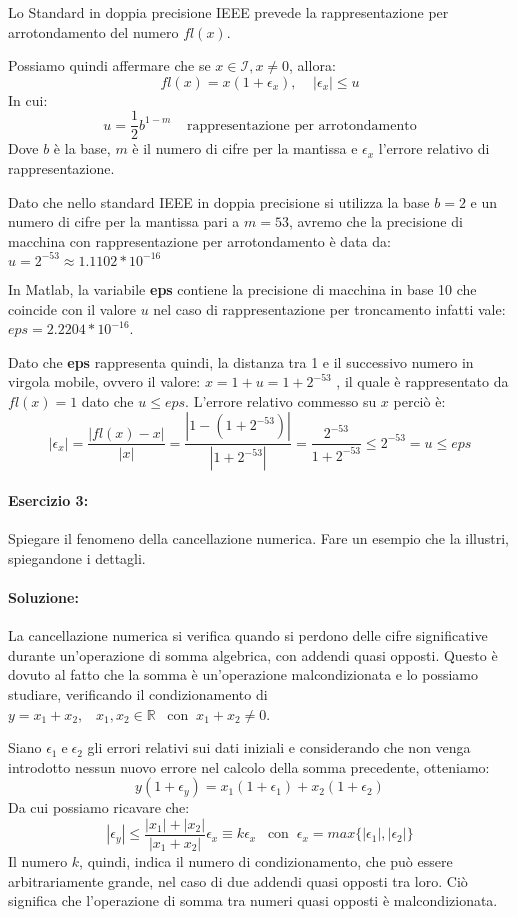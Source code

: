 \documentclass[12pt]{article}
\begin{document}
Lo Standard in doppia precisione IEEE prevede la rappresentazione per arrotondamento del numero \(fl(x)\).

Possiamo quindi affermare che se \(x \in \mathcal{I}, x\neq 0\), allora:
$$ fl(x)=x(1+\epsilon_x), \;\;\;\; |\epsilon_x|\leq u$$
In cui:
$$ u = \frac{1}{2}b^{1-m}\;\;\;\; \text{rappresentazione per arrotondamento}$$   
Dove \(b\) è la base, \(m\) è il numero di cifre per la mantissa e \(\epsilon_x\) l'errore relativo di rappresentazione.

Dato che nello standard IEEE in doppia precisione si utilizza la base \(b=2\) e un numero di cifre per la mantissa pari a \(m=53\), avremo che la 
precisione di macchina con rappresentazione per arrotondamento è data da: \(u=2^{-53}\approx 1.1102* 10^{-16}\)

In Matlab, la variabile \textbf{eps} contiene la precisione di macchina in base 10 che coincide con il valore \(u\) nel caso di rappresentazione per troncamento
infatti vale: \(eps=2.2204*10^{-16}\). 

Dato che \textbf{eps} rappresenta quindi, la distanza tra 1 e il successivo numero in virgola mobile, ovvero il valore: \(x=1+u=1+2^{-53}\)
, il quale è rappresentato da \(fl(x)=1\) dato che \(u\leq eps\). 
L'errore relativo commesso su \(x\) perciò è:
$$ |\epsilon_x| =\frac{|fl(x)-x|}{|x|}=\frac{|1-(1+2^{-53})|}{|1+2^{-53}|}=\frac{2^{-53}}{1+2^{-53}} \le 2^{-53}=u \le eps$$

\paragraph{Esercizio 3:} Spiegare il fenomeno della cancellazione numerica. Fare un esempio che la illustri, spiegandone i dettagli.

\paragraph{Soluzione:}
La cancellazione numerica si verifica quando si perdono delle cifre significative durante un'operazione di somma algebrica, con addendi quasi opposti.
Questo è dovuto al fatto che la somma è un'operazione malcondizionata e lo possiamo studiare, verificando il condizionamento di \(y=x_1+x_2,\;\;\; x_1,x_2 \in \mathbb{R} \;\;\;\text{con}\;\; x_1+x_2\neq 0\).

Siano \(\epsilon_1 \;\text{e}\; \epsilon_2\) gli errori relativi sui dati iniziali e considerando che non venga introdotto nessun nuovo errore nel calcolo della somma precedente, otteniamo:
$$ y(1+\epsilon_y)=x_1(1+\epsilon_1)+x_2(1+\epsilon_2)$$
Da cui possiamo ricavare che:
$$ |\epsilon_y|\leq \frac{|x_1|+|x_2|}{|x_1+x_2|}\epsilon_x\equiv k\epsilon_x \;\;\;\text{con}\;\; \epsilon_x = max\{|\epsilon_1|,|\epsilon_2|\} $$
Il numero \(k\), quindi, indica il numero di condizionamento, che può essere arbitrariamente grande, nel caso di due addendi quasi opposti tra loro. 
Ciò significa che l'operazione di somma tra numeri quasi opposti è malcondizionata.
\end{document}
